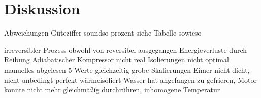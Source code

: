 \section{Diskussion}
\label{sec:Diskussion}
Abweichungen Güteziffer soundso prozent siehe Tabelle sowieso

irreversibler Prozess obwohl von reversibel ausgegangen
Energieverluste durch Reibung
Adiabatischer Kompressor nicht real
Isolierungen nicht optimal
manuelles abgelesen 5 Werte gleichzeitig
grobe Skalierungen
Eimer nicht dicht, nicht unbedingt perfekt wärmeisoliert
Wasser hat angefangen zu gefrieren, Motor konnte nicht mehr gleichmäßig durchrühren, inhomogene Temperatur